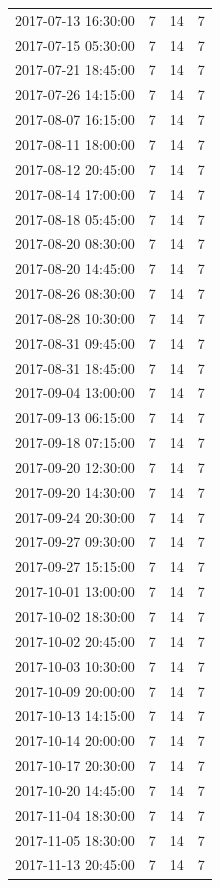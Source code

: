 \begin{tabular}{lrrr}
2017-07-13 16:30:00 & 7 & 14 & 7 \\
2017-07-15 05:30:00 & 7 & 14 & 7 \\
2017-07-21 18:45:00 & 7 & 14 & 7 \\
2017-07-26 14:15:00 & 7 & 14 & 7 \\
2017-08-07 16:15:00 & 7 & 14 & 7 \\
2017-08-11 18:00:00 & 7 & 14 & 7 \\
2017-08-12 20:45:00 & 7 & 14 & 7 \\
2017-08-14 17:00:00 & 7 & 14 & 7 \\
2017-08-18 05:45:00 & 7 & 14 & 7 \\
2017-08-20 08:30:00 & 7 & 14 & 7 \\
2017-08-20 14:45:00 & 7 & 14 & 7 \\
2017-08-26 08:30:00 & 7 & 14 & 7 \\
2017-08-28 10:30:00 & 7 & 14 & 7 \\
2017-08-31 09:45:00 & 7 & 14 & 7 \\
2017-08-31 18:45:00 & 7 & 14 & 7 \\
2017-09-04 13:00:00 & 7 & 14 & 7 \\
2017-09-13 06:15:00 & 7 & 14 & 7 \\
2017-09-18 07:15:00 & 7 & 14 & 7 \\
2017-09-20 12:30:00 & 7 & 14 & 7 \\
2017-09-20 14:30:00 & 7 & 14 & 7 \\
2017-09-24 20:30:00 & 7 & 14 & 7 \\
2017-09-27 09:30:00 & 7 & 14 & 7 \\
2017-09-27 15:15:00 & 7 & 14 & 7 \\
2017-10-01 13:00:00 & 7 & 14 & 7 \\
2017-10-02 18:30:00 & 7 & 14 & 7 \\
2017-10-02 20:45:00 & 7 & 14 & 7 \\
2017-10-03 10:30:00 & 7 & 14 & 7 \\
2017-10-09 20:00:00 & 7 & 14 & 7 \\
2017-10-13 14:15:00 & 7 & 14 & 7 \\
2017-10-14 20:00:00 & 7 & 14 & 7 \\
2017-10-17 20:30:00 & 7 & 14 & 7 \\
2017-10-20 14:45:00 & 7 & 14 & 7 \\
2017-11-04 18:30:00 & 7 & 14 & 7 \\
2017-11-05 18:30:00 & 7 & 14 & 7 \\
2017-11-13 20:45:00 & 7 & 14 & 7 \\

\end{tabular}
